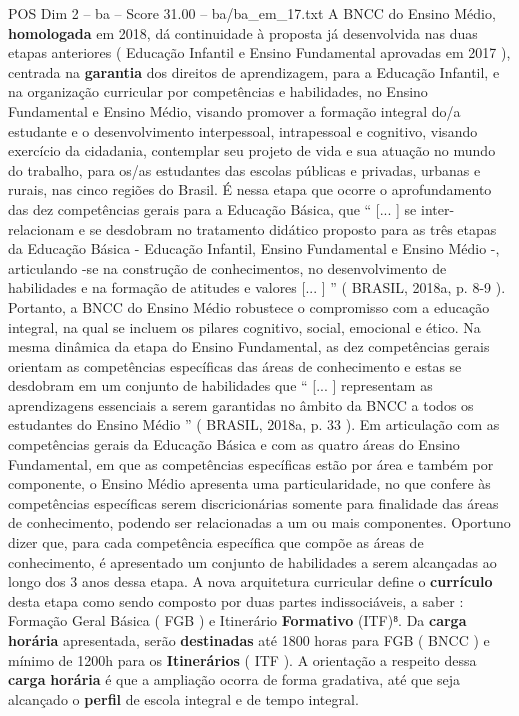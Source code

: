 \begin{textsample}{POS Dim 2 – ba – Score 31.00 – ba/ba\_em\_17.txt}
A BNCC do Ensino Médio, \textbf{homologada} em 2018, dá continuidade à proposta já desenvolvida nas duas etapas anteriores ( Educação Infantil e Ensino Fundamental aprovadas em 2017 ), centrada na \textbf{garantia} dos direitos de aprendizagem, para a Educação Infantil, e na organização curricular por competências e habilidades, no Ensino Fundamental e Ensino Médio, visando promover a formação integral do/a estudante e o desenvolvimento interpessoal, intrapessoal e cognitivo, visando exercício da cidadania, contemplar seu projeto de vida e sua atuação no mundo do trabalho, para os/as estudantes das escolas públicas e privadas, urbanas e rurais, nas cinco regiões do Brasil.
É nessa etapa que ocorre o aprofundamento das dez competências gerais para a Educação Básica, que “ [... ] se inter-relacionam e se desdobram no tratamento didático proposto para as três etapas da Educação Básica - Educação Infantil, Ensino Fundamental e Ensino Médio -, articulando -se na construção de conhecimentos, no desenvolvimento de habilidades e na formação de atitudes e valores [... ] ” ( BRASIL, 2018a, p. 8-9 ).
Portanto, a BNCC do Ensino Médio robustece o compromisso com a educação integral, na qual se incluem os pilares cognitivo, social, emocional e ético.
Na mesma dinâmica da etapa do Ensino Fundamental, as dez competências gerais orientam as competências específicas das áreas de conhecimento e estas se desdobram em um conjunto de habilidades que “ [... ] representam as aprendizagens essenciais a serem garantidas no âmbito da BNCC a todos os estudantes do Ensino Médio ” ( BRASIL, 2018a, p. 33 ).
Em articulação com as competências gerais da Educação Básica e com as quatro áreas do Ensino Fundamental, em que as competências específicas estão por área e também por componente, o Ensino Médio apresenta uma particularidade, no que confere às competências específicas serem discricionárias somente para finalidade das áreas de conhecimento, podendo ser relacionadas a um ou mais componentes.
Oportuno dizer que, para cada competência específica que compõe as áreas de conhecimento, é apresentado um conjunto de habilidades a serem alcançadas ao longo dos 3 anos dessa etapa.
A nova arquitetura curricular define o \textbf{currículo} desta etapa como sendo composto por duas partes indissociáveis, a saber : Formação Geral Básica ( FGB ) e Itinerário \textbf{Formativo} (ITF)⁸.
Da \textbf{carga} \textbf{horária} apresentada, serão \textbf{destinadas} até 1800 horas para FGB ( BNCC ) e mínimo de 1200h para os \textbf{Itinerários} ( ITF ).
A orientação a respeito dessa \textbf{carga} \textbf{horária} é que a ampliação ocorra de forma gradativa, até que seja alcançado o \textbf{perfil} de escola integral e de tempo integral.

\end{textsample}
